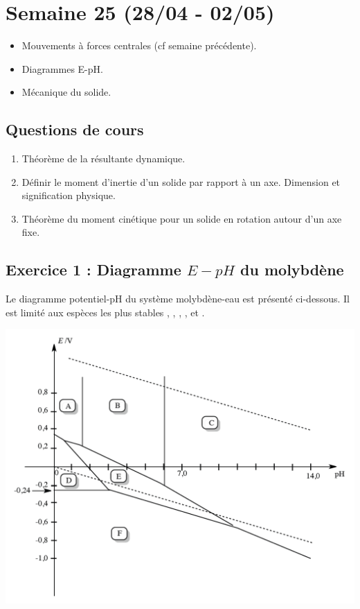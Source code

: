 \section{Semaine 25 (28/04 - 02/05) }


\begin{itemize}
	\item Mouvements à forces centrales (cf semaine précédente).
	\item Diagrammes E-pH.
	\item Mécanique du solide.
\end{itemize}

\subsection{Questions de cours}

\begin{enumerate}
	\item Théorème de la résultante dynamique.
	\item Définir le moment d'inertie d'un solide par rapport à un axe. Dimension et signification physique.
	\item Théorème du moment cinétique pour un solide en rotation autour d'un axe fixe.
\end{enumerate}

\subsection{Exercice 1 : Diagramme $E-pH$ du molybdène}

Le diagramme potentiel-pH du système molybdène-eau est présenté ci-dessous. Il est limité aux espèces les plus stables , , , ,  et .

\includegraphics[width=\textwidth]{Images/mpsi_s25_ex01.png}

